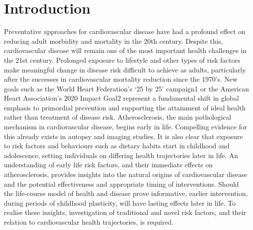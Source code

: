 \section{Introduction}
Preventative approaches for cardiovascular disease have had a profound effect on reducing adult morbidity and mortality in the 20th century. Despite this, cardiovascular disease will remain one of the most important health challenges in the 21st century. Prolonged exposure to lifestyle and other types of risk factors make meaningful change in disease risk difficult to achieve as adults, particularly after the successes in cardiovascular mortality reduction since the 1970’s.
New goals such as the World Heart Federation’s ‘25 by 25’ campaign1 or the American Heart Association’s 2020 Impact Goal2 represent a fundamental shift in global emphasis to primordial prevention and supporting the attainment of ideal health rather than treatment of disease risk.
Atherosclerosis, the main pathological mechanism in cardiovascular disease, begins early in life. Compelling evidence for this already exists in autopsy and imaging studies. It is also clear that exposure to risk factors and behaviours such as dietary habits start in childhood and adolescence, setting individuals on differing health trajectories later in life. 
An understanding of early life risk factors, and their immediate effects on atherosclerosis, provides insights into the natural origins of cardiovascular disease and the potential effectiveness and appropriate timing of interventions. Should the life-course model of health and disease prove informative, earlier intervention, during periods of childhood plasticity, will have lasting effects later in life. To realise these insights, investigation of traditional and novel risk factors, and their relation to cardiovascular health trajectories, is required. 
